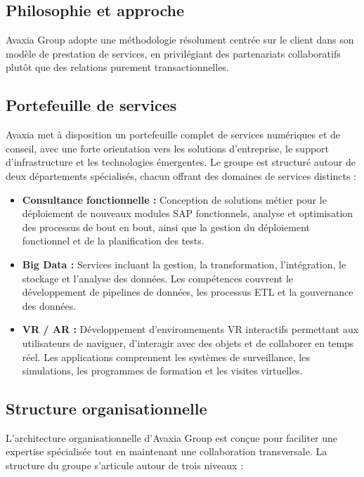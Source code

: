 \subsection{Philosophie et approche}

Avaxia Group adopte une méthodologie résolument centrée sur le client dans son modèle
de prestation de services, en privilégiant des partenariats collaboratifs plutôt que des
relations purement transactionnelles.

\subsection{Portefeuille de services}

Avaxia met à disposition  un portefeuille complet de services numériques et de conseil, avec une
forte orientation vers les solutions d'entreprise, le support d'infrastructure et les
technologies émergentes. Le groupe est structuré autour de deux départements spécialisés,
chacun offrant des domaines de services distincts :

\begin{itemize}[leftmargin=*, label=\textbullet]
  \item \textbf{Consultance fonctionnelle :} Conception de solutions métier pour le
        déploiement de nouveaux modules SAP fonctionnels, analyse et optimisation des
        processus de bout en bout, ainsi que la gestion du déploiement fonctionnel et de
        la planification des tests.
  \item \textbf{Big Data :} Services incluant la gestion, la transformation, l'intégration,
        le stockage et l'analyse des données. Les compétences couvrent le développement de
        pipelines de données, les processus ETL et la gouvernance des données.
  \item \textbf{VR / AR :} Développement d'environnements VR interactifs permettant aux
        utilisateurs de naviguer, d'interagir avec des objets et de collaborer en temps
        réel. Les applications comprennent les systèmes de surveillance, les simulations,
        les programmes de formation et les visites virtuelles.
\end{itemize}

\subsection{Structure organisationnelle}

L'architecture organisationnelle d'Avaxia Group est conçue pour faciliter une expertise
spécialisée tout en maintenant une collaboration transversale. La structure du groupe
s'articule autour de trois niveaux :

